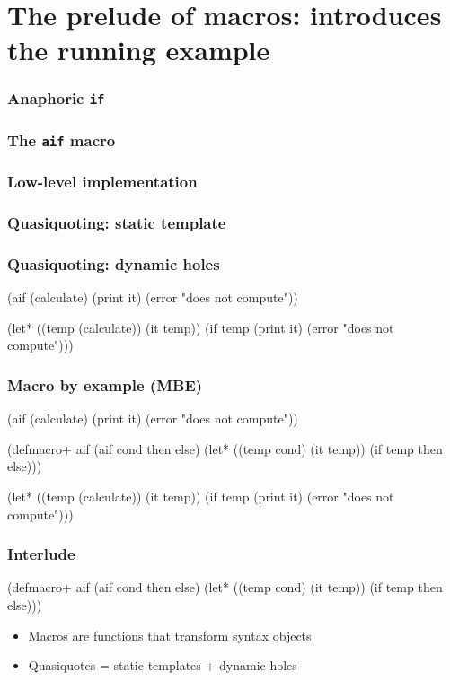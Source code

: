 \documentclass[hyperref={bookmarks=false}]{beamer}
\begin{document}
\section{The prelude of macros: introduces the running example}

\begin{frame}[fragile]
\frametitle<1>{Anaphoric \texttt{if}}
\frametitle<2>{The \texttt{aif} macro}
\frametitle<3>{Low-level implementation}
\frametitle<4>{Quasiquoting: static template}
\frametitle<5>{Quasiquoting: dynamic holes}
\begin{semiverbatim}
(aif (calculate)
  (print it)
  (error "does not compute"))


(let* ((temp (calculate))
       (it temp))
  (if temp
    (print it)
    (error "does not compute")))
\end{semiverbatim}
\end{frame}

\begin{frame}[fragile]
\frametitle{Macro by example (MBE)}
\begin{semiverbatim}
(aif (calculate)
  (print it)
  (error "does not compute"))

(defmacro+ aif
  \alert{(aif cond then else)}
  (let* ((temp \alert{cond})
         (it temp))
    (if temp
        \alert{then}
        \alert{else})))

(let* ((temp (calculate))
       (it temp))
  (if temp
    (print it)
    (error "does not compute")))
\end{semiverbatim}
\end{frame}

\begin{frame}[fragile]
\frametitle{Interlude}

\begin{semiverbatim}
(defmacro+ aif
  (aif cond then else)
  (let* ((temp cond)
         (it temp))
    (if temp then else)))
\end{semiverbatim}

\vskip50pt

\begin{itemize}
\item Macros are functions that transform syntax objects
\item Quasiquotes = static templates + dynamic holes
\end{itemize}
\end{frame}
\end{document}
